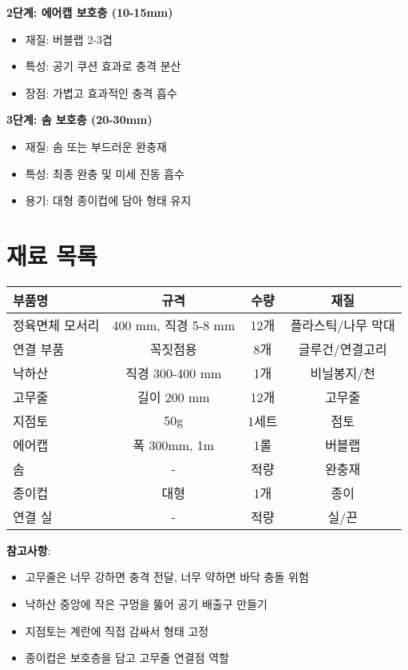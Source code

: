 \documentclass[a4paper,12pt]{article}
\begin{document}
\begin{CJK}{UTF8}{mj}
\textbf{2단계: 에어캡 보호층 (10-15mm)}
\begin{itemize}
    \item 재질: 버블랩 2-3겹
    \item 특성: 공기 쿠션 효과로 충격 분산
    \item 장점: 가볍고 효과적인 충격 흡수
\end{itemize}

\textbf{3단계: 솜 보호층 (20-30mm)}
\begin{itemize}
    \item 재질: 솜 또는 부드러운 완충재
    \item 특성: 최종 완충 및 미세 진동 흡수
    \item 용기: 대형 종이컵에 담아 형태 유지
\end{itemize}

\section{재료 목록}

\begin{center}
\begin{tabular}{lccc}
\toprule
\textbf{부품명} & \textbf{규격} & \textbf{수량} & \textbf{재질} \\
\midrule
정육면체 모서리 & 400 mm, 직경 5-8 mm & 12개 & 플라스틱/나무 막대 \\
연결 부품 & 꼭짓점용 & 8개 & 글루건/연결고리 \\
낙하산 & 직경 300-400 mm & 1개 & 비닐봉지/천 \\
고무줄 & 길이 200 mm & 12개 & 고무줄 \\
지점토 & 50g & 1세트 & 점토 \\
에어캡 & 폭 300mm, 1m & 1롤 & 버블랩 \\
솜 & - & 적량 & 완충재 \\
종이컵 & 대형 & 1개 & 종이 \\
연결 실 & - & 적량 & 실/끈 \\
\bottomrule
\end{tabular}
\end{center}

\vspace{0.5cm}

\textbf{참고사항}:
\begin{itemize}
    \item 고무줄은 너무 강하면 충격 전달, 너무 약하면 바닥 충돌 위험
    \item 낙하산 중앙에 작은 구멍을 뚫어 공기 배출구 만들기
    \item 지점토는 계란에 직접 감싸서 형태 고정
    \item 종이컵은 보호층을 담고 고무줄 연결점 역할
\end{itemize}


\end{CJK}
\end{document}
